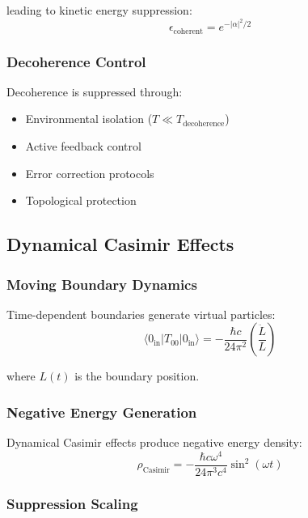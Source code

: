 leading to kinetic energy suppression:
\begin{equation}
\epsilon_{\text{coherent}} = e^{-|\alpha|^2/2}
\end{equation}

\subsubsection{Decoherence Control}

Decoherence is suppressed through:
\begin{itemize}
\item Environmental isolation ($T \ll T_{\text{decoherence}}$)
\item Active feedback control  
\item Error correction protocols
\item Topological protection
\end{itemize}

\subsection{Dynamical Casimir Effects}

\subsubsection{Moving Boundary Dynamics}

Time-dependent boundaries generate virtual particles:
\begin{equation}
\langle 0_{\text{in}}| T_{00} |0_{\text{in}}\rangle = -\frac{\hbar c}{24\pi^2} \left(\frac{\ddot{L}}{L}\right)
\end{equation}

where $L(t)$ is the boundary position.

\subsubsection{Negative Energy Generation}

Dynamical Casimir effects produce negative energy density:
\begin{equation}
\rho_{\text{Casimir}} = -\frac{\hbar c \omega^4}{24\pi^3 c^4} \sin^2(\omega t)
\end{equation}

\subsubsection{Suppression Scaling}

